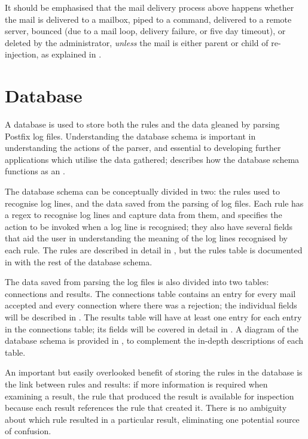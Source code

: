 It should be emphasised that the mail delivery process above happens
whether the mail is delivered to a mailbox, piped to a command, delivered
to a remote server, bounced (due to a mail loop, delivery failure, or five
day timeout), or deleted by the administrator, \textit{unless\/} the mail
is either parent or child of re-injection, as explained in
.

\section{Database}

\label{database}

A database is used to store both the rules and the data gleaned by parsing
Postfix log files.  Understanding the database schema is important in
understanding the actions of the parser, and essential to developing
further applications which utilise the data gathered;  describes how the database schema functions as an .

The database schema can be conceptually divided in two: the rules used to
recognise log lines, and the data saved from the parsing of log files.
Each rule has a regex to recognise log lines and capture data from them,
and specifies the action to be invoked when a log line is recognised; they
also have several fields that aid the user in understanding the meaning of
the log lines recognised by each rule.  The rules are described in detail
in , but the rules table is documented
in  with the rest of the database schema.

The data saved from parsing the log files is also divided into two tables:
connections and results.  The connections table contains an entry for every
mail accepted and every connection where there was a rejection; the
individual fields will be described in .  The
results table will have at least one entry for each entry in the
connections table; its fields will be covered in detail in
.  A diagram of the database schema is provided
in , to complement the
in-depth descriptions of each table.

An important but easily overlooked benefit of storing the rules in the
database is the link between rules and results: if more information is
required when examining a result, the rule that produced the result is
available for inspection because each result references the rule that
created it.  There is no ambiguity about which rule resulted in a
particular result, eliminating one potential source of confusion.

